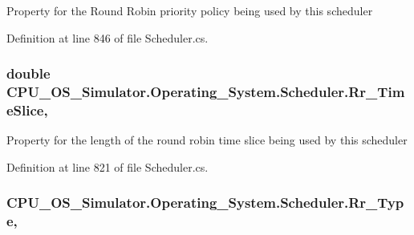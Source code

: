 Property for the Round Robin priority policy being used by this scheduler 



Definition at line 846 of file Scheduler.\+cs.

\hypertarget{class_c_p_u___o_s___simulator_1_1_operating___system_1_1_scheduler_ab21e8ffe8d0f06388cc2310d3dbb3b48}{}
\subsubsection[{Rr\+\_\+\+Time\+Slice}]{\setlength{\rightskip}{0pt plus 5cm}double C\+P\+U\+\_\+\+O\+S\+\_\+\+Simulator.\+Operating\+\_\+\+System.\+Scheduler.\+Rr\+\_\+\+Time\+Slice\hspace{0.3cm}{\ttfamily [get]}, {\ttfamily [set]}}\label{class_c_p_u___o_s___simulator_1_1_operating___system_1_1_scheduler_ab21e8ffe8d0f06388cc2310d3dbb3b48}


Property for the length of the round robin time slice being used by this scheduler 



Definition at line 821 of file Scheduler.\+cs.

\hypertarget{class_c_p_u___o_s___simulator_1_1_operating___system_1_1_scheduler_acc7c4b6c0383e4cf1a65251335f44e6d}{}
\subsubsection[{Rr\+\_\+\+Type}]{ C\+P\+U\+\_\+\+O\+S\+\_\+\+Simulator.\+Operating\+\_\+\+System.\+Scheduler.\+Rr\+\_\+\+Type\hspace{0.3cm}{\ttfamily [get]}, {\ttfamily [set]}}\label{class_c_p_u___o_s___simulator_1_1_operating___system_1_1_scheduler_acc7c4b6c0383e4cf1a65251335f44e6d}


